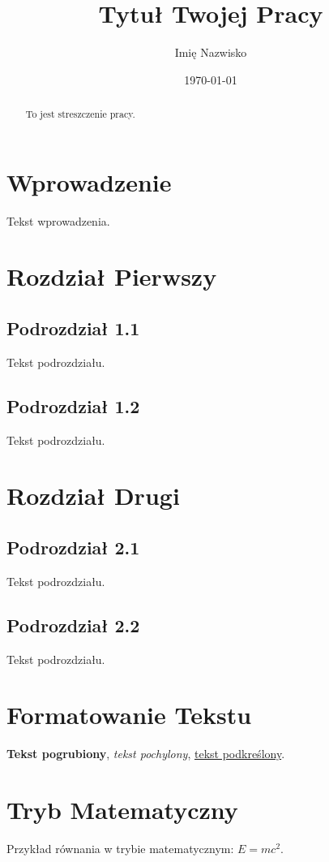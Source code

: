 \documentclass{article}
\title{Tytuł Twojej Pracy}
\author{Imię Nazwisko}
\date{\today}
\begin{document}
\maketitle

\begin{abstract}
    To jest streszczenie pracy.
\end{abstract}

\section{Wprowadzenie}
Tekst wprowadzenia.

\section{Rozdział Pierwszy}
\subsection{Podrozdział 1.1}
Tekst podrozdziału.

\subsection{Podrozdział 1.2}
Tekst podrozdziału.

\section{Rozdział Drugi}
\subsection{Podrozdział 2.1}
Tekst podrozdziału.

\subsection{Podrozdział 2.2}
Tekst podrozdziału.

\section{Formatowanie Tekstu}
\textbf{Tekst pogrubiony}, \emph{tekst pochylony}, \underline{tekst podkreślony}.

\section{Tryb Matematyczny}
Przykład równania w trybie matematycznym: $E=mc^2$.
\end{document}
